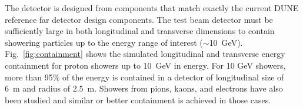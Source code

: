 

The detector is designed from components that match exactly the current DUNE reference far detector design components. 
The test beam detector must be sufficiently large in both
longitudinal and transverse dimensions to contain showering particles up to the energy range of interest ($\sim$10~GeV).
Fig.~\ref{fig:containment} shows the simulated longitudinal and transverse 
energy containment for proton showers up to 10~GeV in energy.
For 10 GeV showers, more than 95\% of the energy is contained in a detector of longitudinal size of 6~m and 
radius of 2.5~m. Showers from pions, kaons, and electrons have also been studied and similar or better containment
is achieved in those cases. 
